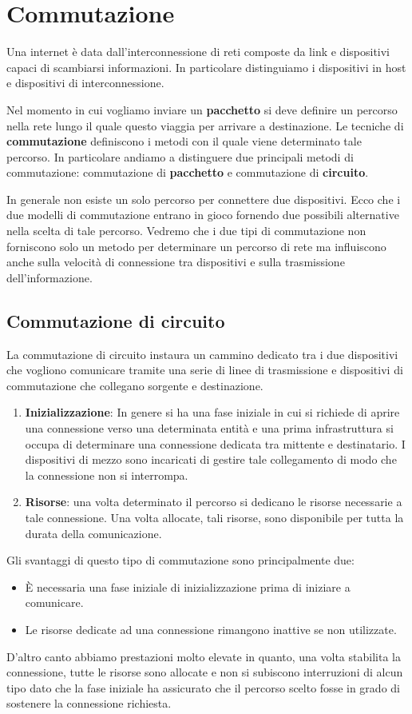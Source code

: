 \section{Commutazione}
Una internet è data dall'interconnessione di reti composte da link e 
dispositivi capaci di scambiarsi informazioni. In particolare
distinguiamo i dispositivi in host e dispositivi di interconnessione.

Nel momento in cui vogliamo inviare un \textbf{pacchetto} si deve
definire un percorso nella rete lungo il quale questo viaggia per
arrivare a destinazione. Le tecniche di \textbf{commutazione} 
definiscono i metodi con il quale viene determinato tale percorso. In
particolare andiamo a distinguere due principali metodi di
commutazione: commutazione di \textbf{pacchetto} e commutazione di 
\textbf{circuito}.

In generale non esiste un solo percorso per connettere due dispositivi.
Ecco che i due modelli di commutazione entrano in gioco fornendo due 
possibili alternative nella scelta di tale percorso. Vedremo che i due
tipi di commutazione non forniscono solo un metodo per determinare un 
percorso di rete ma influiscono anche sulla velocità di connessione 
tra dispositivi e sulla trasmissione dell'informazione.

\subsection{Commutazione di circuito}
La commutazione di circuito instaura un cammino dedicato tra i due
dispositivi che vogliono comunicare tramite una serie di linee di 
trasmissione e dispositivi di commutazione che collegano sorgente e 
destinazione.
\begin{enumerate}
	\item \textbf{Inizializzazione}: In genere si ha una fase iniziale
		in cui si richiede di aprire una connessione verso una 
		determinata entità e una prima infrastruttura si occupa di 
		determinare una connessione dedicata tra mittente e 
		destinatario. I dispositivi di mezzo sono incaricati di 
		gestire tale collegamento di modo che la connessione non si 
		interrompa.
	\item \textbf{Risorse}: una volta determinato il percorso si
		dedicano le risorse necessarie a tale connessione. Una volta 
		allocate, tali risorse, sono disponibile per tutta la durata
		della comunicazione.
\end{enumerate}
Gli svantaggi di questo tipo di commutazione sono principalmente due:
\begin{itemize}
	\item \`E necessaria una fase iniziale di inizializzazione prima
		di iniziare a comunicare.
	\item Le risorse dedicate ad una connessione rimangono inattive 
		se non utilizzate.
\end{itemize}
D'altro canto abbiamo prestazioni molto elevate in quanto, una volta 
stabilita la connessione, tutte le risorse sono allocate e non si 
subiscono interruzioni di alcun tipo dato che la fase iniziale ha 
assicurato che il percorso scelto fosse in grado di sostenere la 
connessione richiesta.

